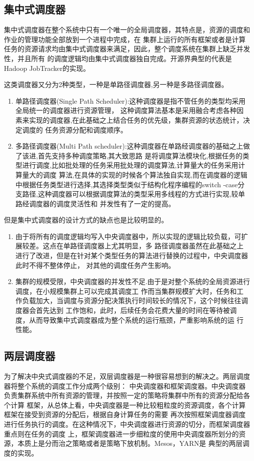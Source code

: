 \subsection{集中式调度器}
集中式调度器在整个系统中只有一个唯一的全局调度器，其特点是，资源的调度和作业的管理功能全部放到一个进程中完成，在
集群上运行的所有框架或者是计算任务的资源请求均由集中式调度器来满足，因此，整个调度系统在集群上缺乏并发性，并且所有
的调度逻辑均由集中式调度器独自完成。开源界典型的代表是Hadoop JobTracker的实现。

这类调度器又分为2种类型，一种是单路径调度器,另一种是多路径调度器。
\begin{enumerate}
\item 单路径调度器(Single Path Scheduler):这种调度器是指不管任务的类型均采用全局统一的调度器进行资源管理，
这种调度算法基本是采用融合考虑各种因素来实现的调度器,在此基础之上结合任务的优先级，集群资源的状态统计，决定调度的
任务资源分配和调度顺序。
\item 多路径调度器(Multi Path scheduler):这种调度器在单路经调度器的基础之上做了该进,首先支持多种调度策略,其大致思路
是将调度算法模块化,根据任务的类型进行调度,比如批处理的任务采用批处理的调度算法,计算量大的任务采用计算量大的调度
算法,在具体的实现的时候各个算法独自实现,而在调度器的逻辑中根据任务类型进行选择,其选择类型类似于结构化程序编程的switch
-case分支路径,这种调度器可以根据调度算法的类型采用多线程的方式进行实现,较单路经调度器的调度灵活性和
并发性有了一定的提高。
\end{enumerate}

但是集中式调度器的设计方式的缺点也是比较明显的。
\begin{enumerate}
\item 由于将所有的调度逻辑均写入中央调度器中，所以实现的逻辑比较负载，可扩展较差。这点在单路径调度器上尤其明显，多
路径调度器虽然在此基础之上进行了改进，但是在针对某个类型任务的算法进行替换的过程中，中央调度器此时不得不整体停止，
对其他的调度任务产生影响。
\item 集群的规模受限，中央调度器的并发性不足.由于是对整个系统的全局资源进行调度，在小规模集群上可以完成其调度工
作而当集群规模扩大时，任务和工作负载加大，当调度与资源分配决策执行时间较长的情况下，这个时候往往调度器会首先达到
工作饱和，此时，后续任务会花费大量的时间在等待被调度，从而导致集中式调度器成为整个系统的运行瓶颈，严重影响系统的运
行性能。
\end{enumerate}

\subsection{两层调度器}
为了解决中央式调度器的不足，双层调度器是一种很容易想到的解决之。两层调度器将整个系统的调度工作分成两个级别：
中央调度器和框架调度器。中央调度器负责集群系统中所有资源的管理，并按照一定的策略将集群中所有的资源分配给各个计算
框架，从总体上看，中央调度器是一种比较粗粒度的资源调度，各个计算框架在接受到资源的分配后，根据自身计算任务的需要
再次按照框架调度器调度进行任务执行的调度。在这种情况下，中央调度器进行资源的切分，而框架调度器重点则在任务的调度
上，框架调度器进一步细粒度的使用中央调度器所划分的资源，本质上是分而治之策略或者是策略下放机制。Mesos，YARN是
典型的两层调度的实现。

